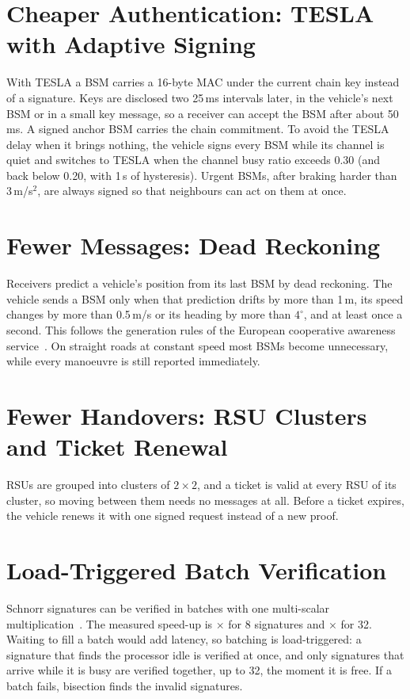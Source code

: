\section{Cheaper Authentication: TESLA with Adaptive Signing}

With TESLA a BSM carries a 16-byte MAC under the current chain key instead of a signature. Keys are
disclosed two 25\,ms intervals later, in the vehicle's next BSM or in a small key message, so a
receiver can accept the BSM after about 50\,ms. A signed anchor BSM carries the chain commitment. To
avoid the TESLA delay when it brings nothing, the vehicle signs every BSM while its channel is quiet
and switches to TESLA when the channel busy ratio exceeds 0.30 (and back below 0.20, with 1\,s of
hysteresis). Urgent BSMs, after braking harder than 3\,m/s$^2$, are always signed so that neighbours
can act on them at once.

\section{Fewer Messages: Dead Reckoning}

Receivers predict a vehicle's position from its last BSM by dead reckoning. The vehicle sends a BSM
only when that prediction drifts by more than 1\,m, its speed changes by more than 0.5\,m/s or its
heading by more than $4^\circ$, and at least once a second. This follows the generation rules of the
European cooperative awareness service~\cite{etsi302637}. On straight roads at constant speed most
BSMs become unnecessary, while every manoeuvre is still reported immediately.

\section{Fewer Handovers: RSU Clusters and Ticket Renewal}

RSUs are grouped into clusters of $2\times2$, and a ticket is valid at every RSU of its cluster, so
moving between them needs no messages at all. Before a ticket expires, the vehicle renews it with one
signed request instead of a new proof.

\section{Load-Triggered Batch Verification}

Schnorr signatures can be verified in batches with one multi-scalar multiplication~\cite{bellare1998batch}.
The measured speed-up is $\times$ for 8 signatures and
$\times$ for 32. Waiting to fill a batch would add latency, so batching is
load-triggered: a signature that finds the processor idle is verified at once, and only signatures
that arrive while it is busy are verified together, up to 32, the moment it is free. If a batch fails,
bisection finds the invalid signatures.

